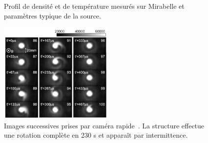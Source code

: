 \begin{refsection}
\begin{figure}[!htbp] 
  \centering
    \caption{Profil de densité et de température mesurés sur Mirabelle et
    paramètres typique de la source\parencite{Bousselin}.}
    \label{4-MirabelleExp}
\end{figure}
\begin{figure}[!htbp]
\centering
\includegraphics[width=0.5\textwidth]{figures/4-CybeleNAGDIS.png}
\caption{Images successives prises par caméra rapide~\parencite{NagdisCamera}.
La structure effectue une rotation complète en 230 \micro s et apparaît par
intermittence.
\label{4-CybeleNagdis}}
\end{figure}


\end{refsection}

